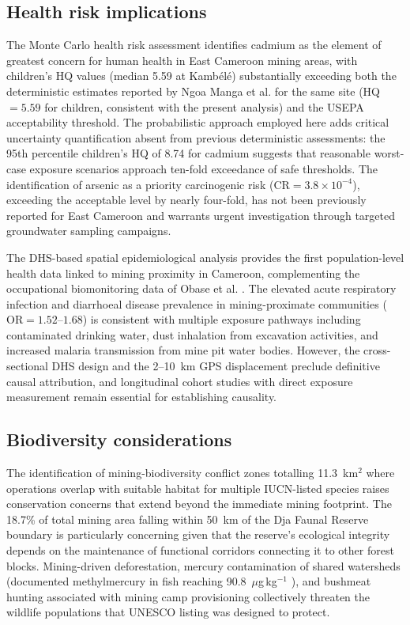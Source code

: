 \documentclass[preprint,12pt,number]{elsarticle}
\begin{document}
\subsection{Health risk implications}

The Monte Carlo health risk assessment identifies cadmium as the element of greatest concern for human health in East Cameroon mining areas, with children's HQ values (median 5.59 at Kamb\'{e}l\'{e}) substantially exceeding both the deterministic estimates reported by Ngoa Manga et al. \cite{NgoaManga2024} for the same site (HQ $= 5.59$ for children, consistent with the present analysis) and the USEPA acceptability threshold. The probabilistic approach employed here adds critical uncertainty quantification absent from previous deterministic assessments: the 95th percentile children's HQ of 8.74 for cadmium suggests that reasonable worst-case exposure scenarios approach ten-fold exceedance of safe thresholds. The identification of arsenic as a priority carcinogenic risk ($\text{CR} = 3.8 \times 10^{-4}$), exceeding the acceptable level by nearly four-fold, has not been previously reported for East Cameroon and warrants urgent investigation through targeted groundwater sampling campaigns.

The DHS-based spatial epidemiological analysis provides the first population-level health data linked to mining proximity in Cameroon, complementing the occupational biomonitoring data of Obase et al. \cite{Obase2023}. The elevated acute respiratory infection and diarrhoeal disease prevalence in mining-proximate communities ($\text{OR} = 1.52$--$1.68$) is consistent with multiple exposure pathways including contaminated drinking water, dust inhalation from excavation activities, and increased malaria transmission from mine pit water bodies. However, the cross-sectional DHS design and the 2--10~km GPS displacement preclude definitive causal attribution, and longitudinal cohort studies with direct exposure measurement remain essential for establishing causality.

\subsection{Biodiversity considerations}

The identification of mining-biodiversity conflict zones totalling 11.3~km$^{2}$ where operations overlap with suitable habitat for multiple IUCN-listed species raises conservation concerns that extend beyond the immediate mining footprint. The 18.7\% of total mining area falling within 50~km of the Dja Faunal Reserve boundary is particularly concerning given that the reserve's ecological integrity depends on the maintenance of functional corridors connecting it to other forest blocks. Mining-driven deforestation, mercury contamination of shared watersheds (documented methylmercury in fish reaching 90.8~$\mu$g\,kg$^{-1}$ \cite{Mahmoudou2024}), and bushmeat hunting associated with mining camp provisioning \cite{Laurance2006} collectively threaten the wildlife populations that UNESCO listing was designed to protect.
\end{document}
